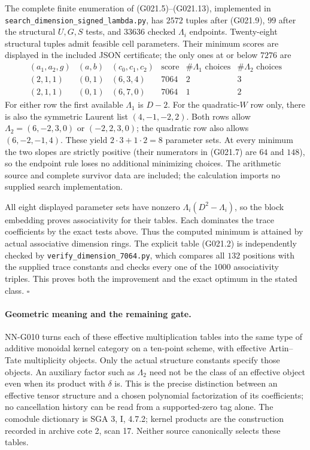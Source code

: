 The complete finite enumeration of (G021.5)--(G021.13),
implemented in \texttt{search\_dimension\_signed\_lambda.py},
has $2572$ tuples after (G021.9), $99$ after the structural
$U,G,S$ tests, and $33636$ checked $\Lambda_i$ endpoints.
Twenty-eight structural tuples admit feasible cell parameters.
Their minimum scores are displayed in the included JSON
certificate; the only ones at or below $7276$ are
\[
 \begin{array}{c|c|c|c|c|c}
 (a_1,a_2,g)&(a,b)&(c_0,c_1,c_2)&\text{score}
       &\#\Lambda_1\text{ choices}&\#\Lambda_2\text{ choices}\\\hline
 (2,1,1)&(0,1)&(6,3,4)&7064&2&3\\
 (2,1,1)&(0,1)&(6,7,0)&7064&1&2
 \end{array}                                           \tag{G021.14}
\]
For either row the first available $\Lambda_1$ is $D-2$.
For the quadratic-$W$ row only, there is also the symmetric
Laurent list $(4,-1,-2,2)$. Both rows allow
$\Lambda_2=(6,-2,3,0)$ or $(-2,2,3,0)$; the quadratic row
also allows $(6,-2,-1,4)$. These yield $2\cdot3+1\cdot2=8$
parameter sets. At every minimum the two slopes are strictly
positive (their numerators in (G021.7) are $64$ and $148$),
so the endpoint rule loses no additional minimizing choices.
The arithmetic source and complete survivor data are included;
the calculation imports no supplied search implementation.

All eight displayed parameter sets have nonzero
$\Lambda_i(D^2-\Lambda_i)$, so the block embedding proves
associativity for their tables. Each dominates the trace
coefficients by the exact tests above. Thus the computed
minimum is attained by actual associative dimension rings.
The explicit table (G021.2) is independently checked by
\texttt{verify\_dimension\_7064.py}, which compares all $132$
positions with the supplied trace constants and checks every
one of the $1000$ associativity triples. This proves both
the improvement and the exact optimum in the stated class.
\hfill$\square$

\paragraph{Geometric meaning and the remaining gate.}
NN-G010 turns each of these effective multiplication tables
into the same type of additive monoidal kernel category on
a ten-point scheme, with effective Artin--Tate multiplicity
objects. Only the actual structure constants specify those
objects. An auxiliary factor such as $\Lambda_2$ need not
be the class of an effective object even when its product
with $\delta$ is. This is the precise distinction between
an effective tensor structure and a chosen polynomial
factorization of its coefficients; no cancellation history
can be read from a supported-zero tag alone.
The comodule dictionary is SGA 3, I, 4.7.2; kernel products
are the construction recorded in archive cote 2, scan 17.
Neither source canonically selects these tables.

